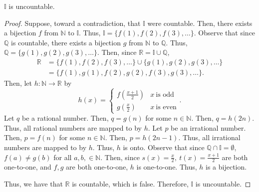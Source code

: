 \documentclass[12pt]{article}
\begin{document}
\newpage
{} $\mathbb I$ is uncountable.
\begin{proof}
    Suppose, toward a contradiction, that $\mathbb I$ were countable. Then, there exists a bijection $f$ from $\mathbb N$ to $\mathbb I$. Thus, $\mathbb I = \{f(1), f(2), f(3), \hdots\}$. Observe that since $\mathbb Q$ is countable, there exists a bijection $g$ from $\mathbb N$ to $\mathbb Q$. Thus, $\mathbb Q = \{g(1), g(2), g(3), \hdots\}$. Then, since $\mathbb R = \mathbb I \cup \mathbb Q$,
    \begin{align*}
        \mathbb R &= \{f(1), f(2), f(3), \hdots\} \cup \{g(1), g(2), g(3), \hdots\} \\
                  &= \{f(1), g(1), f(2), g(2), f(3), g(3), \hdots\}.
    \end{align*}
    Then, let $h:\mathbb N \to \mathbb R$ by $$h(x) =
        \begin{cases}
            f(\frac{x+1}2) & x~\text{is odd} \\
            g(\frac x2)    & x~\text{is even}
        \end{cases}.$$
    Let $q$ be a rational number. Then, $q = g(n)$ for some $n \in \mathbb N$. Then, $q = h(2n)$. Thus, all rational numbers are mapped to by $h$. Let $p$ be an irrational number. Then, $p = f(n)$ for some $n \in \mathbb N$. Then, $p = h(2n - 1)$. Thus, all irrational numbers are mapped to by $h$. Thus, $h$ is onto. 
    Observe that since $\mathbb Q \cap \mathbb I = \emptyset$, $f(a) \neq g(b)$ for all $a,b, \in \mathbb N$. Then, since $s(x) = \frac x2,~t(x) = \frac{x+1}2$ are both one-to-one, and $f,g$ are both one-to-one, $h$ is one-to-one. Thus, $h$ is a bijection.
    
    Thus, we have that $\mathbb R$ is countable, which is false. Therefore, $\mathbb I$ is uncountable.
\end{proof}
\end{document}
